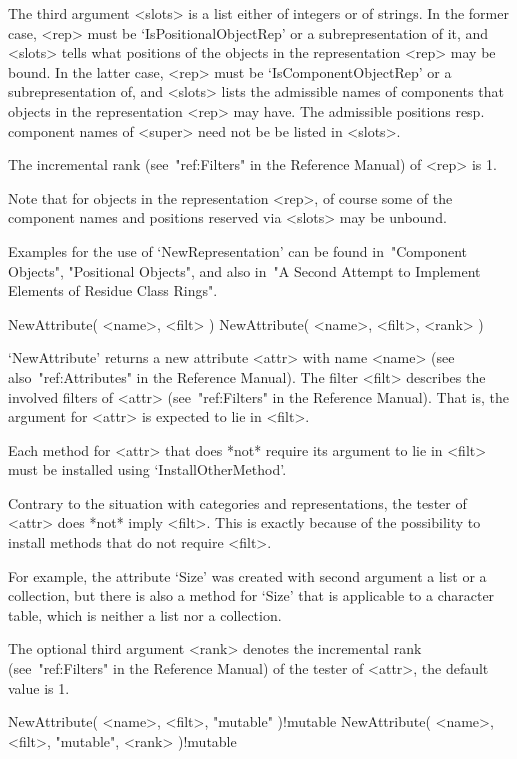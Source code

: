 The third argument <slots> is a list either of integers or of strings.
In the former case, <rep> must be `IsPositionalObjectRep' or a
subrepresentation of it, and <slots> tells what positions of the objects
in the representation <rep> may be bound.
In the latter case, <rep> must be `IsComponentObjectRep' or a
subrepresentation of, and <slots> lists the admissible names of
components that objects in the representation <rep> may have.
The admissible positions resp. component names of <super> need not be
be listed in <slots>.

The incremental rank (see~"ref:Filters" in the Reference Manual)
of <rep> is 1.

Note that for objects in the representation <rep>,
of course some of the component names and positions reserved via <slots>
may be unbound.

Examples for the use of `NewRepresentation' can be found
in~"Component Objects", "Positional Objects", and also
in~"A Second Attempt to Implement Elements of Residue Class Rings".



\>NewAttribute( <name>, <filt> )
\>NewAttribute( <name>, <filt>, <rank> )

`NewAttribute' returns a new attribute <attr> with name <name>
(see also~"ref:Attributes" in the Reference Manual).
The filter <filt> describes the involved filters of <attr>
(see~"ref:Filters" in the Reference Manual).
That is, the argument for <attr> is expected to lie in <filt>.

Each method for <attr> that does *not* require its argument to lie
in <filt> must be installed using `InstallOtherMethod'.

Contrary to the situation with categories and representations,
the tester of <attr> does *not* imply <filt>.
This is exactly because of the possibility to install methods
that do not require <filt>.

For example, the attribute `Size' was created with second argument
a list or a collection,
but there is also a method for `Size' that is applicable to
a character table, which is neither a list nor a collection.

The optional third argument <rank> denotes the incremental rank
(see~"ref:Filters" in the Reference Manual) of the tester of <attr>,
the default value is 1.

\>NewAttribute( <name>, <filt>, "mutable" )!{mutable}
\>NewAttribute( <name>, <filt>, "mutable", <rank> )!{mutable}

